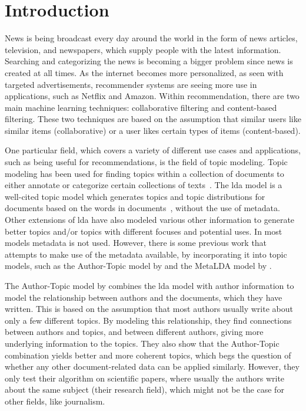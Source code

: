 \section{Introduction}\label{sec:introduction}
News is being broadcast every day around the world in the form of news articles, television, and newspapers, which supply people with the latest information.
Searching and categorizing the news is becoming a bigger problem since news is created at all times.
As the internet becomes more personalized, as seen with targeted advertisements, recommender systems are seeing more use in applications, such as Netflix and Amazon.
Within recommendation, there are two main machine learning techniques: collaborative filtering and content-based filtering.
These two techniques are based on the assumption that similar users like similar items (collaborative) or a user likes certain types of items (content-based).

One particular field, which covers a variety of different use cases and applications, such as being useful for recommendations, is the field of topic modeling.
Topic modeling has been used for finding topics within a collection of documents to either annotate or categorize certain collections of texts~\cite{Probabilistic_Topic_Models}.
The \gls{lda} model is a well-cited topic model which generates topics and topic distributions for documents based on the words in documents~\cite{blei2003latent}, without the use of metadata.
Other extensions of \gls{lda} have also modeled various other information to generate better topics and/or topics with different focuses and potential uses.
In most models metadata is not used.
However, there is some previous work that attempts to make use of the metadata available, by incorporating it into topic models, such as the Author-Topic model by \citet{author_topic_2012} and the MetaLDA model by \citet{MetaLDA2017}.

The Author-Topic model by \citet{author_topic_2012} combines the \gls{lda} model with author information to model the relationship between authors and the documents, which they have written.
This is based on the assumption that most authors usually write about only a few different topics.
By modeling this relationship, they find connections between authors and topics, and between different authors, giving more underlying information to the topics.
They also show that the Author-Topic combination yields better and more coherent topics, which begs the question of whether any other document-related data can be applied similarly.
However, they only test their algorithm on scientific papers, where usually the authors write about the same subject (their research field), which might not be the case for other fields, like journalism. 

